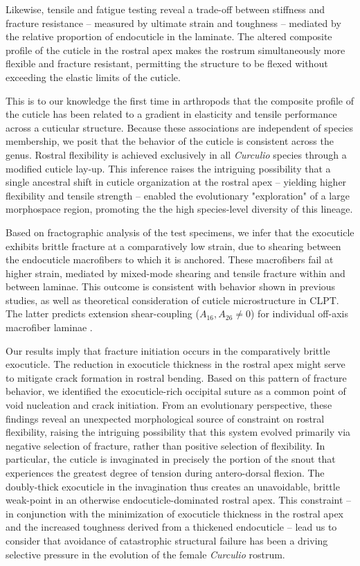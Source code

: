 \documentclass[twocolumn, linenumbers, superscriptaddress, nofootinbib]{revtex4-1}
\begin{document}
		Likewise, tensile and fatigue testing reveal a trade-off between stiffness and fracture resistance -- measured by ultimate strain and toughness -- mediated by the relative proportion of endocuticle in the laminate.
		The altered composite profile of the cuticle in the rostral apex makes the rostrum simultaneously more flexible and fracture resistant, permitting the structure to be flexed without exceeding the elastic limits of the cuticle.
	
		This is to our knowledge the first time in arthropods that the composite profile of the cuticle has been related to a gradient in elasticity and tensile performance across a cuticular structure.
		Because these associations are independent of species membership, we posit that the behavior of the cuticle is consistent across the genus.
		Rostral flexibility is achieved exclusively in all \textit{Curculio} species through a modified cuticle lay-up.
		This inference raises the intriguing possibility that a single ancestral shift in cuticle organization at the rostral apex -- yielding higher flexibility and tensile strength -- enabled the evolutionary "exploration" of a large morphospace region, promoting the the high species-level diversity of this lineage.
		
		Based on fractographic analysis of the test specimens, we infer that the exocuticle exhibits brittle fracture at a comparatively low strain, due to shearing between the endocuticle macrofibers to which it is anchored.
		These macrofibers fail at higher strain, mediated by mixed-mode shearing and tensile fracture within and between laminae.
		This outcome is consistent with behavior shown in previous studies, as well as theoretical consideration of cuticle microstructure in CLPT.
		The latter predicts extension shear-coupling ($A_{16}, A_{26}\neq{0}$) for individual off-axis macrofiber laminae \cite{Jones2014, Reddy2004}.
		
		Our results imply that fracture initiation occurs in the comparatively brittle exocuticle.
		The reduction in exocuticle thickness in the rostral apex might serve to mitigate crack formation in rostral bending.
		Based on this pattern of fracture behavior, we identified the exocuticle-rich occipital suture as a common point of void nucleation and crack initiation.
		From an evolutionary perspective, these findings reveal an unexpected morphological source of constraint on rostral flexibility, raising the intriguing possibility that this system evolved primarily via negative selection of fracture, rather than positive selection of flexibility.
		In particular, the cuticle is invaginated in precisely the portion of the snout that experiences the greatest degree of tension during antero-dorsal flexion.
		The doubly-thick exocuticle in the invagination thus creates an unavoidable, brittle weak-point in an otherwise endocuticle-dominated rostral apex.
		This constraint -- in conjunction with the minimization of exocuticle thickness in the rostral apex and the increased toughness derived from a thickened endocuticle -- lead us to consider that avoidance of catastrophic structural failure has been a driving selective pressure in the evolution of the female \textit{Curculio} rostrum.	
		
\end{document}
